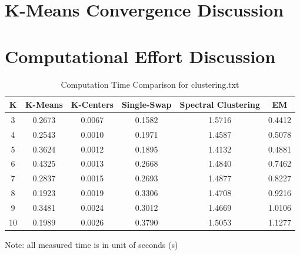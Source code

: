 \section{\Large K-Means Convergence Discussion}


\section{\Large Computational Effort Discussion}

\begin{table}[H]
	\centering
	\caption{Computation Time Comparison for clustering.txt}
	\label{table:time_clustering}	
	\begin{tabular}{ c | c | c | c | c | c }
		\hline \hline
		K  	&	K-Means    & K-Centers    & Single-Swap    & Spectral Clustering    & EM \\[0.1cm]
		\hline
		3	   &	0.2673     & 0.0067   & 0.1582    & 1.5716    & 0.4412 \\[0.1cm]
		4    &	0.2543     & 0.0010   & 0.1971    & 1.4587    & 0.5078 \\[0.1cm]
		5    &	0.3624     & 0.0012   & 0.1895    & 1.4132    & 0.4881 \\[0.1cm]
		6    &	0.4325     & 0.0013   & 0.2668    & 1.4840    & 0.7462 \\[0.1cm]
		7    &	0.2837     & 0.0015   & 0.2693    & 1.4877    & 0.8227 \\[0.1cm]
		8    &	0.1923     & 0.0019   & 0.3306    & 1.4708    & 0.9216 \\[0.1cm]
		9    &	0.3481     & 0.0024   & 0.3012    & 1.4669    & 1.0106 \\[0.1cm]
		10  &	0.1989     & 0.0026   & 0.3790    & 1.5053    & 1.1277 \\[0.1cm]
		\hline	
	\end{tabular}
\end{table}
{\centering Note: all measured time is in unit of seconds (s)}

